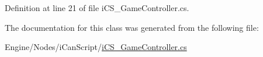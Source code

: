 Definition at line 21 of file i\+C\+S\+\_\+\+Game\+Controller.\+cs.



The documentation for this class was generated from the following file\+:\begin{DoxyCompactItemize}
\item 
Engine/\+Nodes/i\+Can\+Script/\hyperlink{i_c_s___game_controller_8cs}{i\+C\+S\+\_\+\+Game\+Controller.\+cs}\end{DoxyCompactItemize}
